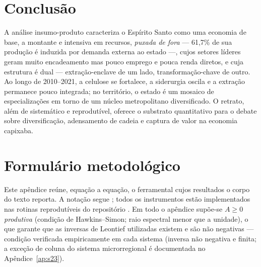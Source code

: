 \documentclass[11pt,a4paper]{article}
\begin{document}
\section{Conclusão}
\label{sec:conclusao}
A análise insumo-produto caracteriza o Espírito Santo como uma economia de base, a
montante e intensiva em recursos, \emph{puxada de fora} --- 61,7\% de sua produção é
induzida por demanda externa ao estado ---, cujos setores líderes geram muito encadeamento mas
pouco emprego e pouca renda diretos, e cuja estrutura é dual --- extração-enclave de um lado,
transformação-chave de outro. Ao longo de 2010--2021, a celulose se fortalece, a
siderurgia oscila e a extração permanece pouco integrada; no território, o estado é um
mosaico de especializações em torno de um núcleo metropolitano diversificado. O retrato, além
de sistemático e reprodutível, oferece o substrato quantitativo para o debate sobre
diversificação, adensamento de cadeia e captura de valor na economia capixaba.

\appendix
\section{Formulário metodológico}
\label{ap:metodologia}
Este apêndice reúne, equação a equação, o ferramental cujos resultados o corpo do texto
reporta. A notação segue \citet{millerblair2009}; todos os instrumentos estão implementados
nas rotinas reprodutíveis do repositório \citep{carvalho2026repo}. Em todo o apêndice supõe-se
$A\ge 0$ \emph{produtiva} (condição de Hawkins--Simon; raio espectral menor que a unidade), o
que garante que as inversas de Leontief utilizadas existem e são não negativas --- condição
verificada empiricamente em cada sistema (inversa não negativa e finita; a exceção de
coluna do sistema microrregional é documentada no Apêndice~\ref{ap:s23}).
\end{document}
